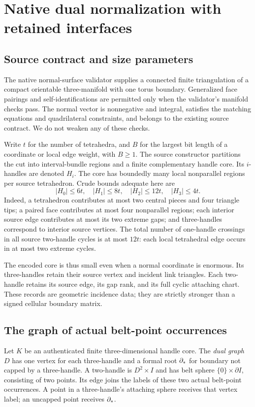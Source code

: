 \section{Native dual normalization with retained interfaces}
\label{sec:geometry}

\subsection{Source contract and size parameters}
The native normal-surface validator supplies a connected finite triangulation
of a compact orientable three-manifold with one torus boundary.  Generalized
face pairings and self-identifications are permitted only when the validator's
manifold checks pass.  The normal vector is nonnegative and integral, satisfies
the matching equations and quadrilateral constraints, and belongs to the
existing source contract.  We do not weaken any of these checks.

Write $t$ for the number of tetrahedra, and $B$ for the largest bit length of
a coordinate or local edge weight, with $B\geq1$.  The source constructor
 partitions the cut into interval-bundle
regions and a finite complementary handle core.  Its $i$-handles are denoted
$H_i$.  The core has boundedly many local nonparallel regions per source
tetrahedron.  Crude bounds adequate here are
\begin{equation}\label{eq:handle-bounds}
 |H_0|\leq6t,\quad |H_1|\leq8t,\quad |H_2|\leq12t,
 \quad |H_3|\leq4t.
\end{equation}
Indeed, a tetrahedron contributes at most two central pieces and four
triangle tips; a paired face contributes at most four nonparallel regions;
each interior source edge contributes at most its two extreme gaps; and
three-handles correspond to interior source vertices.  The total number of
one-handle crossings in all source two-handle cycles is at most $12t$:
each local tetrahedral edge occurs in at most two extreme cycles.

The encoded core is thus small even when a normal coordinate is enormous.
Its three-handles retain their source vertex and incident link triangles.
Each two-handle retains its source edge, its gap rank, and its full cyclic
attaching chart.  These records are geometric incidence data; they are
strictly stronger than a signed cellular boundary matrix.

\subsection{The graph of actual belt-point occurrences}
\begin{definition}
Let $K$ be an authenticated finite three-dimensional handle core.  The
\emph{dual graph} $D$ has one vertex for each three-handle and a formal root
$\partial_*$ for boundary not capped by a three-handle.  A two-handle is
$D^2\times I$ and has belt sphere $\{0\}\times\partial I$, consisting of
two points.  Its edge joins the labels of these two actual belt-point
occurrences.  A point in a three-handle's attaching sphere receives that
vertex label; an uncapped point receives $\partial_*$.
\end{definition}

